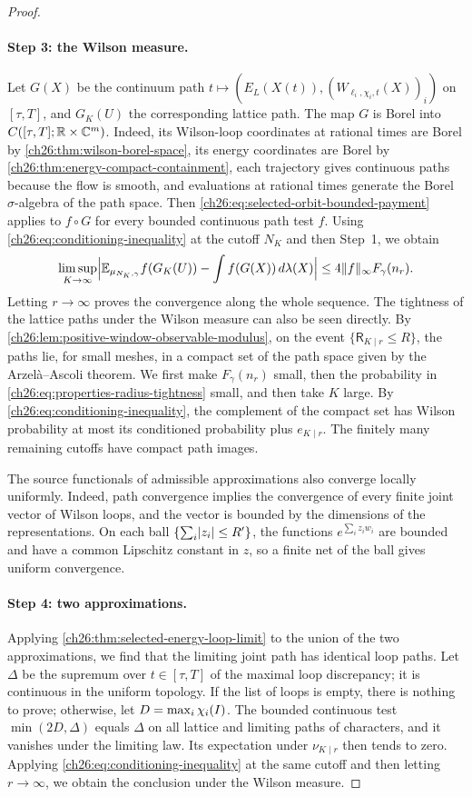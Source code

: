 \begin{proof}
\paragraph{Step 3: the Wilson measure.}
Let $G(X)$ be the continuum path $t\mapsto(E_L(X(t)),(W_{\ell_i,\chi_i,t}(X))_i)$ on $[\tau,T]$, and $G_K(U)$ the corresponding lattice path. The map $G$ is Borel into $C([\tau,T];\mathbb R\times\mathbb C^m)$. Indeed, its Wilson-loop coordinates at rational times are Borel by \cref{ch26:thm:wilson-borel-space}, its energy coordinates are Borel by \cref{ch26:thm:energy-compact-containment}, each trajectory gives continuous paths because the flow is smooth, and evaluations at rational times generate the Borel $\sigma$-algebra of the path space. Then \eqref{ch26:eq:selected-orbit-bounded-payment} applies to $f\circ G$ for every bounded continuous path test $f$. Using \eqref{ch26:eq:conditioning-inequality} at the cutoff $N_K$ and then Step~1, we obtain
\[
 \limsup_{K\to\infty}\Bigl\lvert\mathbb E_{\mu_{N_K,\gamma}}f(G_K(U))-\int f(G(X))\,d\lambda(X)\Bigr\rvert\le4\lVert f\rVert_\infty F_\gamma(n_r).
\]
Letting $r\to\infty$ proves the convergence along the whole sequence. The tightness of the lattice paths under the Wilson measure can also be seen directly. By \cref{ch26:lem:positive-window-observable-modulus}, on the event $\{\mathsf R_{K\mid r}\le R\}$, the paths lie, for small meshes, in a compact set of the path space given by the Arzel\`a--Ascoli theorem. We first make $F_\gamma(n_r)$ small, then the probability in \eqref{ch26:eq:properties-radius-tightness} small, and then take $K$ large. By \eqref{ch26:eq:conditioning-inequality}, the complement of the compact set has Wilson probability at most its conditioned probability plus $e_{K\mid r}$. The finitely many remaining cutoffs have compact path images.

The source functionals of admissible approximations also converge locally uniformly. Indeed, path convergence implies the convergence of every finite joint vector of Wilson loops, and the vector is bounded by the dimensions of the representations. On each ball $\{\sum_i\lvert z_i\rvert\le R'\}$, the functions $e^{\sum_iz_iw_i}$ are bounded and have a common Lipschitz constant in $z$, so a finite net of the ball gives uniform convergence.

\paragraph{Step 4: two approximations.}
Applying \cref{ch26:thm:selected-energy-loop-limit} to the union of the two approximations, we find that the limiting joint path has identical loop paths. Let $\Delta$ be the supremum over $t\in[\tau,T]$ of the maximal loop discrepancy; it is continuous in the uniform topology. If the list of loops is empty, there is nothing to prove; otherwise, let $D=\max_i\chi_i(I)$. The bounded continuous test $\min(2D,\Delta)$ equals $\Delta$ on all lattice and limiting paths of characters, and it vanishes under the limiting law. Its expectation under $\nu_{K\mid r}$ then tends to zero. Applying \eqref{ch26:eq:conditioning-inequality} at the same cutoff and then letting $r\to\infty$, we obtain the conclusion under the Wilson measure.
\end{proof}

